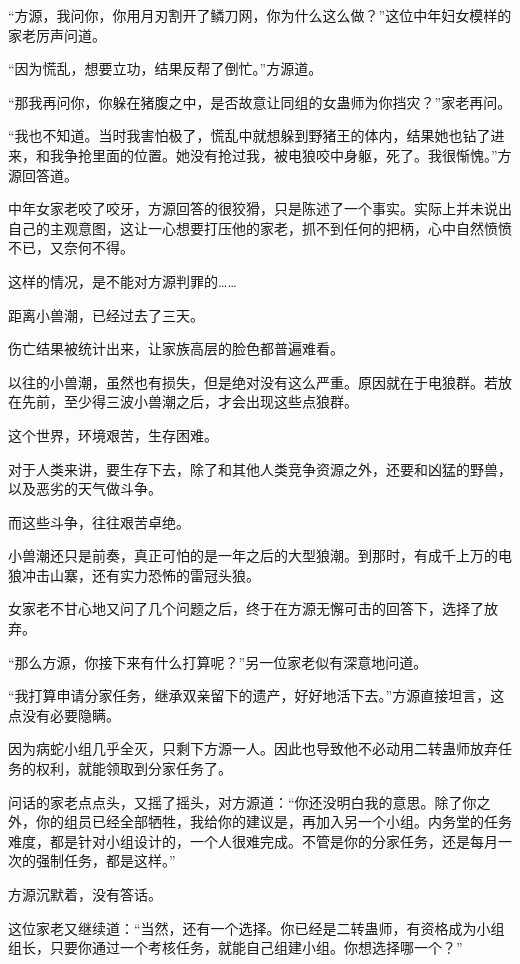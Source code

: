 \begin{this_body}
“方源，我问你，你用月刃割开了鳞刀网，你为什么这么做？”这位中年妇女模样的家老厉声问道。

“因为慌乱，想要立功，结果反帮了倒忙。”方源道。

“那我再问你，你躲在猪腹之中，是否故意让同组的女蛊师为你挡灾？”家老再问。

“我也不知道。当时我害怕极了，慌乱中就想躲到野猪王的体内，结果她也钻了进来，和我争抢里面的位置。她没有抢过我，被电狼咬中身躯，死了。我很惭愧。”方源回答道。

中年女家老咬了咬牙，方源回答的很狡猾，只是陈述了一个事实。实际上并未说出自己的主观意图，这让一心想要打压他的家老，抓不到任何的把柄，心中自然愤愤不已，又奈何不得。

这样的情况，是不能对方源判罪的……

距离小兽潮，已经过去了三天。

伤亡结果被统计出来，让家族高层的脸色都普遍难看。

以往的小兽潮，虽然也有损失，但是绝对没有这么严重。原因就在于电狼群。若放在先前，至少得三波小兽潮之后，才会出现这些点狼群。

这个世界，环境艰苦，生存困难。

对于人类来讲，要生存下去，除了和其他人类竞争资源之外，还要和凶猛的野兽，以及恶劣的天气做斗争。

而这些斗争，往往艰苦卓绝。

小兽潮还只是前奏，真正可怕的是一年之后的大型狼潮。到那时，有成千上万的电狼冲击山寨，还有实力恐怖的雷冠头狼。

女家老不甘心地又问了几个问题之后，终于在方源无懈可击的回答下，选择了放弃。

“那么方源，你接下来有什么打算呢？”另一位家老似有深意地问道。

“我打算申请分家任务，继承双亲留下的遗产，好好地活下去。”方源直接坦言，这点没有必要隐瞒。

因为病蛇小组几乎全灭，只剩下方源一人。因此也导致他不必动用二转蛊师放弃任务的权利，就能领取到分家任务了。

问话的家老点点头，又摇了摇头，对方源道：“你还没明白我的意思。除了你之外，你的组员已经全部牺牲，我给你的建议是，再加入另一个小组。内务堂的任务难度，都是针对小组设计的，一个人很难完成。不管是你的分家任务，还是每月一次的强制任务，都是这样。”

方源沉默着，没有答话。

这位家老又继续道：“当然，还有一个选择。你已经是二转蛊师，有资格成为小组组长，只要你通过一个考核任务，就能自己组建小组。你想选择哪一个？”


\end{this_body}
